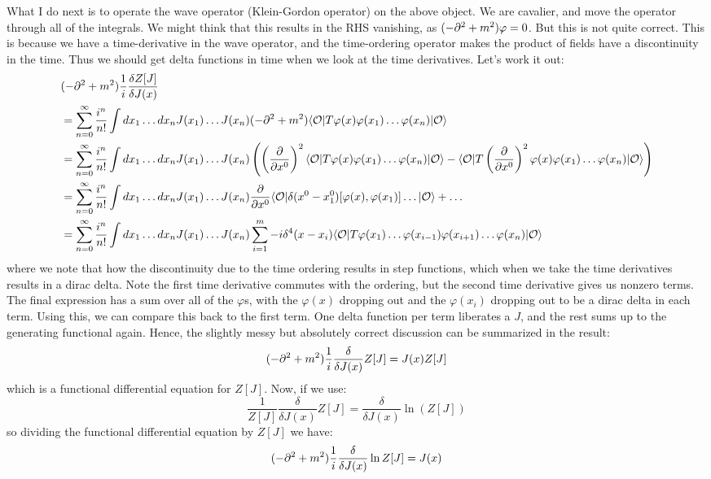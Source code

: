 What I do next is to operate the wave operator (Klein-Gordon operator) on the above object. We are cavalier, and move the operator through all of the integrals. We might think that this results in the RHS vanishing, as $(-\p^2 + m^2)\varphi = 0$. But this is not quite correct. This is because we have a time-derivative in the wave operator, and the time-ordering operator makes the product of fields have a discontinuity in the time. Thus we should get delta functions in time when we look at the time derivatives. Let's work it out:
\begin{equation}
    \begin{split}
        &(-\p^2 + m^2)\frac{1}{i}\frac{\delta Z[J]}{\delta J(x)} 
        \\ &= \sum_{n=0}^\infty \frac{i^n}{n!} \int dx_1 \ldots dx_n J(x_1)\ldots J(x_n) (-\p^2 + m^2)\bra{\O}T\varphi(x)\varphi(x_1) \ldots \varphi(x_n)\ket{\O}
        \\ &= \sum_{n=0}^\infty \frac{i^n}{n!}\int dx_1 \ldots dx_n J(x_1) \ldots J(x_n)\left(\left(\dpd{}{x^0}\right)^2\bra{\O}T\varphi(x)\varphi(x_1) \ldots \varphi(x_n)\ket{\O} - \bra{\O}T\left(\dpd{}{x^0}\right)^2 \varphi(x)\varphi(x_1) \ldots \varphi(x_n)\ket{\O}\right)
        \\ &= \sum_{n=0}^\infty \frac{i^n}{n!} \int dx_1 \ldots dx_n J(x_1)\ldots J(x_n)\dpd{}{x^0}\bra{\O}\delta(x^0 - x_1^0)[\varphi(x), \varphi(x_1)] \ldots \ket{\O} + \ldots 
        \\ &= \sum_{n=0}^\infty \frac{i^n}{n!} \int dx_1 \ldots dx_n J(x_1)\ldots J(x_n)\sum_{i=1}^m -i\delta^4(x - x_i) \bra{\O}T\varphi(x_1) \ldots \varphi(x_{i-1})\varphi(x_{i+1}) \ldots \varphi(x_n)\ket{\O}
    \end{split}
\end{equation}
where we note that how the discontinuity due to the time ordering results in step functions, which when we take the time derivatives results in a dirac delta. Note the first time derivative commutes with the ordering, but the second time derivative gives us nonzero terms. The final expression has a sum over all of the $\varphi$s, with the $\varphi(x)$ dropping out and the $\varphi(x_i)$ dropping out to be a dirac delta in each term. Using this, we can compare this back to the first term. One delta function per term liberates a $J$, and the rest sums up to the generating functional again. Hence, the slightly messy but absolutely correct discussion can be summarized in the result:
\begin{equation}
    (-\partial^2 + m^2)\frac{1}{i}\frac{\delta}{\delta J(x)}Z[J] = J(x)Z[J]
\end{equation}
which is a functional differential equation for $Z[J]$. Now, if we use:
\begin{equation}
    \frac{1}{Z[J]}\frac{\delta}{\delta J(x)}Z[J] = \frac{\delta}{\delta J(x)}\ln(Z[J])
\end{equation}
so dividing the functional differential equation by $Z[J]$ we have:
\begin{equation}
    (-\partial^2 + m^2)\frac{1}{i}\frac{\delta}{\delta J(x)}\ln Z[J] = J(x)
\end{equation}

